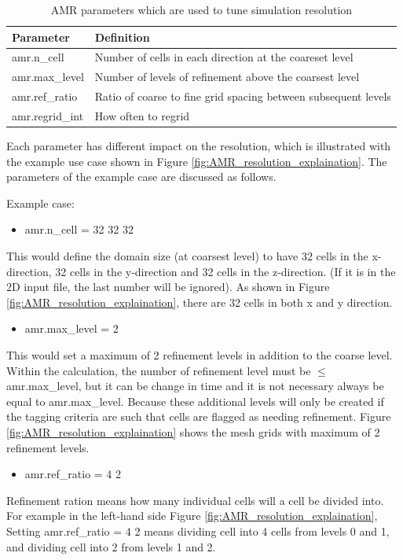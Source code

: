 \begin{table}[H]
\begin{center}
\begin{tabular}{|l|l|}
	\hline
	\textbf{Parameter} & \textbf{Definition}\\ \hline
    amr.n\_cell & Number of cells in each direction at the coareset level\\ 		\hline
    amr.max\_level & Number of levels of refinement above the coarsest level\\
	\hline
    amr.ref\_ratio & Ratio of coarse to fine grid spacing between subsequent levels\\
    \hline
    amr.regrid\_int & How often to regrid\\
    \hline
\end{tabular}
\caption{AMR parameters which are used to tune simulation resolution}
\label{table:table_tune_resolution}
\end{center}
\end{table}

Each parameter has different impact on the resolution, which is illustrated with the example use case shown in Figure \ref{fig:AMR_resolution_explaination}. The parameters of the example case are discussed as follows.

Example case:
\begin{itemize}
\item amr.n\_cell = 32 32 32
\end{itemize}
This would define the domain size (at coarsest level) to have 32 cells in the x-direction, 32 cells in the y-direction and 32 cells in the z-direction. (If it is in the 2D input file, the last number will be ignored). As shown in Figure \ref{fig:AMR_resolution_explaination}, there are 32 cells in both x and y direction.

\begin{itemize}
\item amr.max\_level = 2
\end{itemize}
This would set a maximum of 2 refinement levels in addition to the coarse level. Within the calculation, the number of refinement level must be $\leqslant$ amr.max\_level, but it can be change in time and it is not necessary always be equal to amr.max\_level. Because these additional levels will only be created if the tagging criteria are such that cells are flagged as needing refinement. Figure \ref{fig:AMR_resolution_explaination} shows the mesh grids with maximum of 2 refinement levels.

\begin{itemize}
\item amr.ref\_ratio = 4 2
\end{itemize}
Refinement ration means how many individual cells will a cell be divided into. For example in the left-hand side Figure \ref{fig:AMR_resolution_explaination}, Setting amr.ref\_ratio = 4 2 means dividing cell into 4 cells from levels 0 and 1, and dividing cell into 2 from levels 1 and 2.

